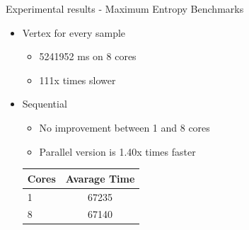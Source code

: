 \documentclass{beamer}
\begin{document}
\begin{frame}{Experimental results - Maximum Entropy Benchmarks}

\begin{itemize}

\item{Vertex for every sample}

\begin{itemize}
\item  5241952 ms  on 8 cores 
\item  111x times slower
\end{itemize}

\item{Sequential}

\begin{itemize}
\item No improvement between 1 and 8 cores
\item Parallel version is 1.40x times faster
\end{itemize}

\begin{table}[!htb]
\centering
\begin{tabular}{ l c }
    \hline\hline
    Cores & Avarage Time \\ [0.2ex]
    \hline
    1 & 67235 \\
    8 & 67140  \\
    \hline
  \end{tabular}
\label{table:maxentres2}
\end{table}

\end{itemize}

\end{frame}

\end{document}
